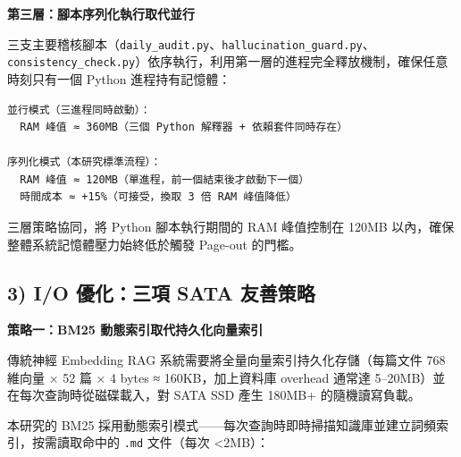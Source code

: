 \begin{Shaded}
\begin{Highlighting}[]
  \OperatorTok{\textgreater{}\textgreater{}}
\end{Highlighting}
\end{Shaded}

\textbf{第三層：腳本序列化執行取代並行}

三支主要稽核腳本（\texttt{daily\_audit.py}、\texttt{hallucination\_guard.py}、\texttt{consistency\_check.py}）依序執行，利用第一層的進程完全釋放機制，確保任意時刻只有一個
Python 進程持有記憶體：

\begin{verbatim}
並行模式（三進程同時啟動）：
  RAM 峰值 ≈ 360MB（三個 Python 解釋器 + 依賴套件同時存在）

序列化模式（本研究標準流程）：
  RAM 峰值 ≈ 120MB（單進程，前一個結束後才啟動下一個）
  時間成本 ≈ +15%（可接受，換取 3 倍 RAM 峰值降低）
\end{verbatim}

三層策略協同，將 Python 腳本執行期間的 RAM 峰值控制在 120MB
以內，確保整體系統記憶體壓力始終低於觸發 Page-out 的門檻。

\subsection{3) I/O 優化：三項 SATA
友善策略}\label{io-ux512aux5316ux4e09ux9805-sata-ux53cbux5584ux7b56ux7565}

\textbf{策略一：BM25 動態索引取代持久化向量索引}

傳統神經 Embedding RAG 系統需要將全量向量索引持久化存儲（每篇文件 768
維向量 × 52 篇 × 4 bytes ≈ 160KB，加上資料庫 overhead 通常達
5--20MB）並在每次查詢時從磁碟載入，對 SATA SSD 產生 180MB+
的隨機讀寫負載。

本研究的 BM25
採用動態索引模式------每次查詢時即時掃描知識庫並建立詞頻索引，按需讀取命中的
\texttt{.md} 文件（每次 \textless2MB）：

\begin{Shaded}
\begin{Highlighting}[]
\OperatorTok{=}
\OperatorTok{=}\NormalTok{ [jieba.lcut(d) }\NormalTok{ docs]}
\end{Highlighting}
\end{Shaded}

